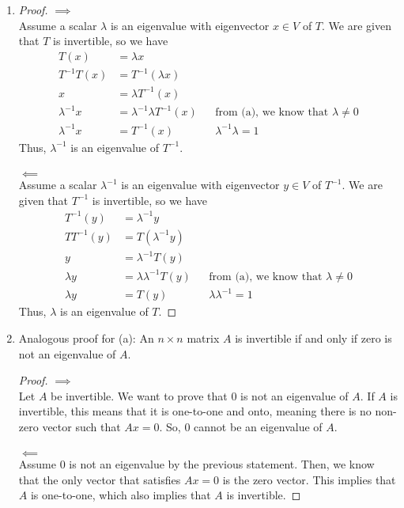 \documentclass[13pt]{article}
\begin{document}
\begin{enumerate}[label=(\alph*),leftmargin=*]
\item
  \begin{proof}
    $\implies$ \\
    Assume a scalar $\lambda$ is an eigenvalue with eigenvector $x \in V$ of $T$. We are given that $T$ is invertible, so we have
    \begin{align*}
      T(x) &= \lambda x \\
      T^{-1}T(x) &= T^{-1}(\lambda x) \\
      x &= \lambda T^{-1}(x) \\
      \lambda^{-1} x &= \lambda^{-1}\lambda T^{-1}(x) && \text{from (a), we know that } \lambda \neq 0 \\
      \lambda^{-1} x &= T^{-1}(x) && \lambda^{-1}\lambda = 1
    \end{align*}
    Thus, $\lambda^{-1}$ is an eigenvalue of $T^{-1}$. \\ \\
    $\impliedby$ \\
    Assume a scalar $\lambda^{-1}$ is an eigenvalue with eigenvector $y \in V$ of $T^{-1}$. We are given that $T^{-1}$ is invertible, so we have
    \begin{align*}
      T^{-1}(y) &= \lambda^{-1} y \\
      TT^{-1}(y) &= T(\lambda^{-1} y) \\
      y &= \lambda^{-1}T(y) \\
      \lambda y &= \lambda\lambda^{-1} T(y) && \text{from (a), we know that } \lambda \neq 0 \\
      \lambda y &= T(y) && \lambda\lambda^{-1} = 1
    \end{align*}
    Thus, $\lambda$ is an eigenvalue of $T$.
  \end{proof}
  \newpage
\item
  Analogous proof for (a): An $n \times n$ matrix $A$ is invertible if and only if zero is not an eigenvalue of $A$.
  \begin{proof}
    $\implies$ \\
    Let $A$ be invertible. We want to prove that $0$ is not an eigenvalue of $A$. If $A$ is invertible, this means that it is one-to-one and onto, meaning there is no non-zero vector such that $Ax = 0$. So, $0$ cannot be an eigenvalue of $A$. \\ \\
    $\impliedby$ \\
    Assume $0$ is not an eigenvalue by the previous statement. Then, we know that the only vector that satisfies $Ax = 0$ is the zero vector. This implies that $A$ is one-to-one, which also implies that $A$ is invertible.

\end{proof}
\end{enumerate}
\end{document}
